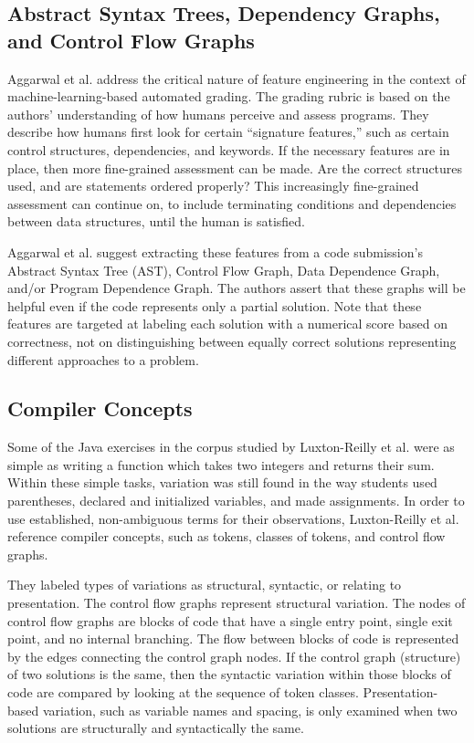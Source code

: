 \subsection{Abstract Syntax Trees, Dependency Graphs, and Control Flow Graphs}

Aggarwal et al. \cite{aggarwalprinciples} address the critical nature of feature engineering in the context of machine-learning-based automated grading. The grading rubric is based on the authors' understanding of how humans perceive and assess programs. They describe how humans first look for certain ``signature features,'' such as certain control structures, dependencies, and keywords. If the necessary features are in place, then more fine-grained assessment can be made. Are the correct structures used, and are statements ordered properly? This increasingly fine-grained assessment can continue on, to include terminating conditions and dependencies between data structures, until the human is satisfied. 

Aggarwal et al. suggest extracting these features from a code submission's Abstract Syntax Tree (AST), Control Flow Graph, Data Dependence Graph, and/or Program Dependence Graph. The authors assert that these graphs will be helpful even if the code represents only a partial solution. Note that these features are targeted at labeling each solution with a numerical score based on correctness, not on distinguishing between equally correct solutions representing different approaches to a problem.



\subsection{Compiler Concepts}

Some of the Java exercises in the corpus studied by Luxton-Reilly et al. \cite{Luxton13} were as simple as writing a function which takes two integers and returns their sum. Within these simple tasks, variation was still found in the way students used parentheses, declared and initialized variables, and made assignments. In order to use established, non-ambiguous terms for their observations, Luxton-Reilly et al. reference compiler concepts, such as tokens, classes of tokens, and control flow graphs. 

They labeled types of variations as structural, syntactic, or relating to presentation. The control flow graphs represent structural variation. The nodes of control flow graphs are blocks of code that have a single entry point, single exit point, and no internal branching. The flow between blocks of code is represented by the edges connecting the control graph nodes. If the control graph (structure) of two solutions is the same, then the syntactic variation within those blocks of code are compared by looking at the sequence of token classes. Presentation-based variation, such as variable names and spacing, is only examined when two solutions are structurally and syntactically the same.

